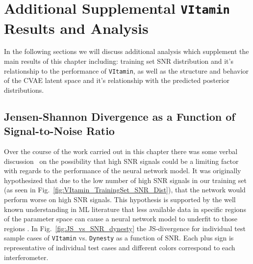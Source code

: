 \section{Additional Supplemental \texttt{VItamin} Results and Analysis}

In the following sections we will discuss additional analysis which supplement the 
main 
results of this chapter including: 
training 
set \ac{SNR} distribution and it's  relationship to the 
performance of \texttt{VItamin}, as well as the structure and behavior 
of the \ac{CVAE} latent space and it's relationship with 
the predicted posterior distributions. 

\subsection{Jensen-Shannon Divergence as a Function of Signal-to-Noise Ratio}

Over the course of the work carried out in this chapter there was 
some verbal discussion~ on the possibility that high \ac{SNR} 
signals could be a limiting factor with regards to the performance of the 
neural network model. It was originally hypothesized that 
due to the low number of high \ac{SNR} signals in our training set 
(as seen in Fig.~\ref{fig:VItamin_TrainingSet_SNR_Dist}), that the 
network would perform worse on high \ac{SNR} signals. This 
hypothesis is supported by the well known understanding in \ac{ML} 
literature that less available data in specific regions of the 
parameter space can cause a neural network model to underfit to those 
regions \cite{Goodfellow-et-al-2016}. In Fig.~\ref{fig:JS_vs_SNR_dynesty}
the \ac{JS}-divergence for individual test sample cases 
of \texttt{VItamin} vs. \texttt{Dynesty} as a function of \ac{SNR}. 
Each plus sign is representative of individual test cases and 
different colors correspond to each interferometer. 

